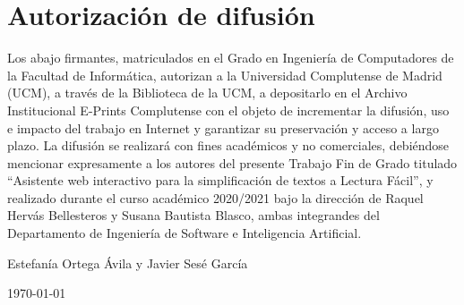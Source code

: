 \chapter*{Autorización de difusión}

   
Los abajo firmantes, matriculados en el Grado en Ingeniería de Computadores de la Facultad de Informática, autorizan a la Universidad Complutense de Madrid (UCM), a través de la  Biblioteca de la UCM, a depositarlo en el Archivo Institucional E-Prints Complutense con el objeto de incrementar la difusión, uso e impacto del trabajo en Internet y garantizar su preservación y acceso a largo plazo. La difusión se realizará con fines académicos y no comerciales, debiéndose mencionar expresamente a los autores del presente Trabajo Fin de Grado titulado ``Asistente web interactivo para la simplificación de textos a Lectura Fácil'', y realizado durante el curso académico 2020/2021 bajo la dirección de Raquel Hervás Bellesteros y Susana Bautista Blasco, ambas integrandes del Departamento de Ingeniería de Software e Inteligencia Artificial.

\vspace{5cm}

\begin{center}
	\large Estefanía Ortega Ávila y Javier Sesé García\\
	
	\vspace{0.5cm}
	
	
	\today\\
	
\end{center}

